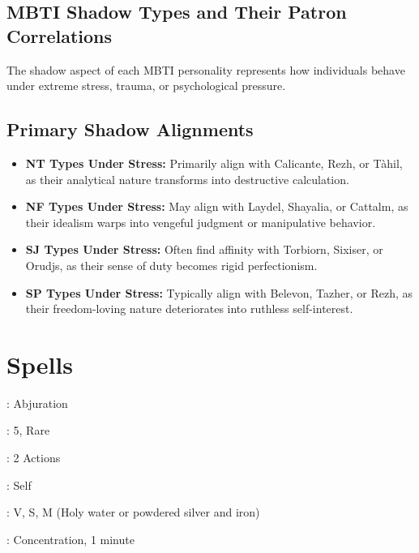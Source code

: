 \documentclass[a4paper,twoside,openany]{book}
\begin{document}
\begin{multicols}{2}
	\section*{MBTI Shadow Types and Their Patron Correlations}

	The shadow aspect of each MBTI personality represents how individuals behave under extreme stress, trauma, or psychological pressure.

	\subsection*{Primary Shadow Alignments}
	\begin{itemize}
		\item \textbf{NT Types Under Stress:} Primarily align with Calicante, Rezh, or Tàhil, as their analytical nature transforms into destructive calculation.
		\item \textbf{NF Types Under Stress:} May align with Laydel, Shayalia, or Cattalm, as their idealism warps into vengeful judgment or manipulative behavior.
		\item \textbf{SJ Types Under Stress:} Often find affinity with Torbiorn, Sixiser, or Orudjs, as their sense of duty becomes rigid perfectionism.
		\item \textbf{SP Types Under Stress:} Typically align with Belevon, Tazher, or Rezh, as their freedom-loving nature deteriorates into ruthless self-interest.
	\end{itemize}

\end{multicols}

\pagebreak

\section{Spells}

\begin{description}[noitemsep, topsep=0pt, parsep=0pt, partopsep=0pt, leftmargin=0cm, labelwidth=2.8cm]
	\item[\textbf{Magic List}]: Abjuration
	\item[\textbf{Level}]: 5, Rare
	\item[\textbf{Casting Time}]: 2 Actions
	\item[\textbf{Range}]: Self
	\item[\textbf{Components}]: V, S, M (Holy water or powdered silver and iron)
	\item[\textbf{Duration}]: Concentration, 1 minute
\end{description}
\end{document}
